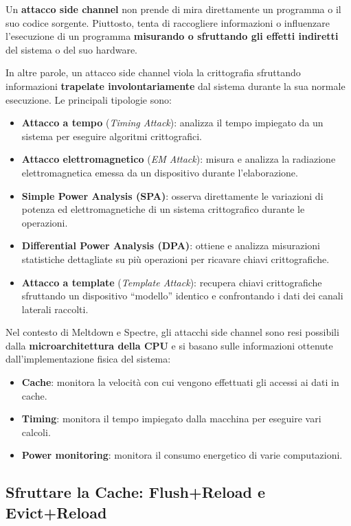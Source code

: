 \documentclass{article}
\begin{document}
Un \textbf{attacco side channel} non prende di mira direttamente un programma o il suo codice sorgente. Piuttosto, tenta di raccogliere informazioni o influenzare l'esecuzione di un programma \textbf{misurando o sfruttando gli effetti indiretti} del sistema o del suo hardware.

In altre parole, un attacco side channel viola la crittografia sfruttando informazioni \textbf{trapelate involontariamente} dal sistema durante la sua normale esecuzione. Le principali tipologie sono:

\begin{itemize}
    \item \textbf{Attacco a tempo} (\textit{Timing Attack}): analizza il tempo impiegato da un sistema per eseguire algoritmi crittografici.
    \item \textbf{Attacco elettromagnetico} (\textit{EM Attack}): misura e analizza la radiazione elettromagnetica emessa da un dispositivo durante l'elaborazione.
    \item \textbf{Simple Power Analysis (SPA)}: osserva direttamente le variazioni di potenza ed elettromagnetiche di un sistema crittografico durante le operazioni.
    \item \textbf{Differential Power Analysis (DPA)}: ottiene e analizza misurazioni statistiche dettagliate su più operazioni per ricavare chiavi crittografiche.
    \item \textbf{Attacco a template} (\textit{Template Attack}): recupera chiavi crittografiche sfruttando un dispositivo ``modello'' identico e confrontando i dati dei canali laterali raccolti.
\end{itemize}

Nel contesto di Meltdown e Spectre, gli attacchi side channel sono resi possibili dalla \textbf{microarchitettura della CPU} e si basano sulle informazioni ottenute dall'implementazione fisica del sistema:

\begin{itemize}
    \item \textbf{Cache}: monitora la velocità con cui vengono effettuati gli accessi ai dati in cache.
    \item \textbf{Timing}: monitora il tempo impiegato dalla macchina per eseguire vari calcoli.
    \item \textbf{Power monitoring}: monitora il consumo energetico di varie computazioni.
\end{itemize}

\subsection*{Sfruttare la Cache: Flush+Reload e Evict+Reload}
\end{document}
